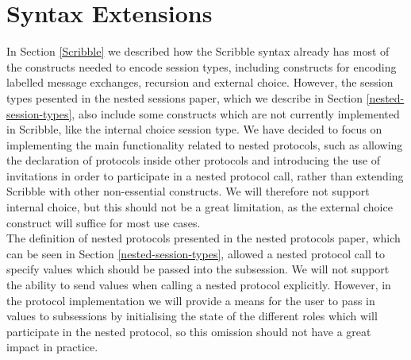 \documentclass[12pt,twoside]{report}
\begin{document}
\section{Syntax Extensions}\label{scribble-extensions}


In Section \ref{Scribble} we described how the Scribble syntax already has most of the constructs needed to encode session types, including constructs for encoding labelled message exchanges, recursion and external choice. However, the session types pesented in the nested sessions paper\cite{nestedprotocols}, which we describe in Section \ref{nested-session-types}, also include some constructs which are not currently implemented in Scribble, like the internal choice session type. We have decided to focus on implementing the main functionality related to nested protocols, such as allowing the declaration of protocols inside other protocols and introducing the use of invitations in order to participate in a nested protocol call, rather than extending Scribble with other non-essential constructs. We will therefore not support internal choice, but this should not be a great limitation, as the external choice construct will suffice for most use cases.
\\

The definition of nested protocols presented in the nested protocols paper\cite{nestedprotocols}, which can be seen in Section \ref{nested-session-types}, allowed a nested protocol call to specify values which should be passed into the subsession. We will not support the ability to send values when calling a nested protocol explicitly. However, in the protocol implementation we will provide a means for the user to pass in values to subsessions by initialising the state of the different roles which will participate in the nested protocol, so this omission should not have a great impact in practice.\\
\end{document}
